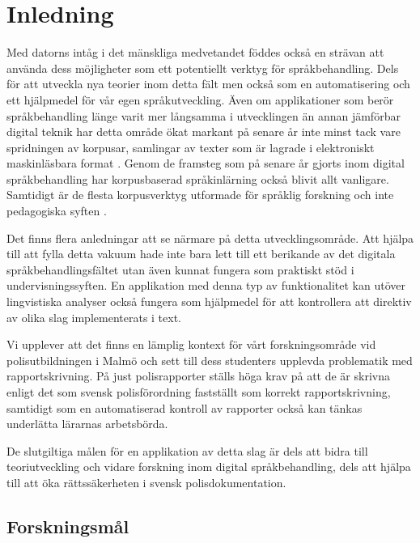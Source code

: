 \documentclass[swedish]{maucsthesis}
\begin{document}
\ifodd\value{page}\else\mbox{}\newpage\fi
\tableofcontents
\newpage
\startpagecount

\section{Inledning}
Med datorns intåg i det mänskliga medvetandet föddes också en strävan att använda
dess möjligheter som ett potentiellt verktyg för språkbehandling. Dels för
att utveckla nya teorier inom detta fält men också som en automatisering och ett
hjälpmedel för vår egen språkutveckling. Även om applikationer som berör
språkbehandling länge varit mer långsamma i utvecklingen än annan jämförbar
digital teknik har detta område ökat markant på senare år inte minst tack vare
spridningen av korpusar, samlingar av texter som är lagrade i elektroniskt
maskinläsbara format \cite{nugues:2014}. Genom de framsteg som på senare år gjorts inom digital språkbehandling har korpusbaserad språkinlärning också blivit allt
vanligare. Samtidigt är de flesta korpusverktyg utformade för språklig
forskning och inte pedagogiska syften \cite{zhu:2015}.

Det finns flera anledningar att se närmare på detta utvecklingsområde. Att hjälpa till att fylla detta vakuum hade inte bara lett till ett berikande av det digitala språkbehandlingsfältet utan även kunnat fungera som praktiskt stöd i undervisningssyften.
En applikation med denna typ av funktionalitet kan utöver lingvistiska analyser
också fungera som hjälpmedel för att kontrollera att direktiv av olika slag
implementerats i text.

Vi upplever att det finns en lämplig kontext för vårt forskningsområde vid polisutbildningen i Malmö och sett till dess studenters upplevda problematik med rapportskrivning. På just polisrapporter
ställs höga krav på att de är skrivna enligt det som svensk polisförordning fastställt som korrekt rapportskrivning, samtidigt som en automatiserad kontroll av rapporter också kan tänkas underlätta lärarnas arbetsbörda.

De slutgiltiga målen för en applikation av detta slag är dels att bidra till
teoriutveckling och vidare forskning inom digital språkbehandling, dels att hjälpa till att
öka rättssäkerheten i svensk polisdokumentation.

\subsection{Forskningsmål}
\end{document}
